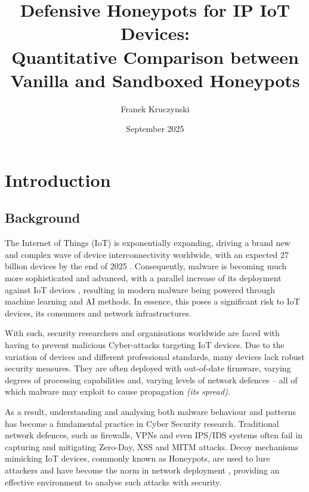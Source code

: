 \documentclass[a4paper,12pt,oneside]{book}			%
\title{\huge\bfseries Defensive Honeypots for IP IoT Devices:\\Quantitative  Comparison between Vanilla and Sandboxed Honeypots}
\author{\LARGE Franek Kruczynski}
\date{September 2025}
\begin{document}
\frontmatter			%
\maketitle				%
\setcounter{page}{1}		%
\pagestyle{fancy}

\tableofcontents 			%

\mainmatter 			%
\clearpage			




\chapter{Introduction}\label{ch:intro}		%
\section{Background}\label{sec:background}	%

The Internet of Things (IoT) is exponentially expanding, driving a brand new and complex wave of device interconnectivity worldwide, with an expected 27 billion devices by the end of 2025 \textit{\citep{autobits2025iot}}. Consequently, malware is becoming much more sophisticated and advanced, with a parallel increase of its deployment against IoT devices \textit{\citep{cornell-malware-analysis}}, resulting in modern malware being powered through machine learning and AI methods. In essence, this poses a significant risk to IoT devices, its consumers and network infrastructures. 

With such, security researchers and organisations worldwide are faced with having to prevent malicious Cyber-attacks targeting IoT devices. Due to the variation of devices and different professional standards, many devices lack robust security measures. They are often deployed with out-of-date firmware, varying degrees of processing capabilities \textit{\citep{security-issue-inIoT}} and, varying levels of network defences – all of which malware may exploit to cause propagation \textit{(its spread)}.

As a result, understanding and analysing both malware behaviour and patterns has become a fundamental practice in Cyber Security research. Traditional network defences, such as firewalls, VPNs and even IPS/IDS systems often fail in capturing and mitigating Zero-Day, XSS and MITM attacks. Decoy mechanisms mimicking IoT devices, commonly known as Honeypots, are used to lure attackers and have become the norm in network deployment \textit{\citep{crowdstrike-honeypot}}, providing an effective environment to analyse such attacks with security. 
\end{document}
